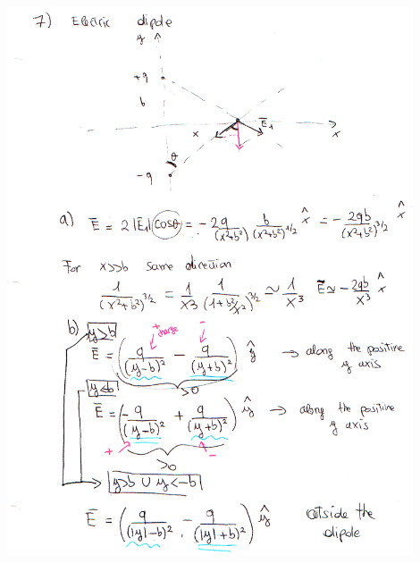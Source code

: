 \documentclass[solutions]{esg8022pset}
\begin{document}
  \begin{center}\includegraphics[width=0.9\textwidth]{ps01_sol_07_1_hand}\end{center}
\end{document}
